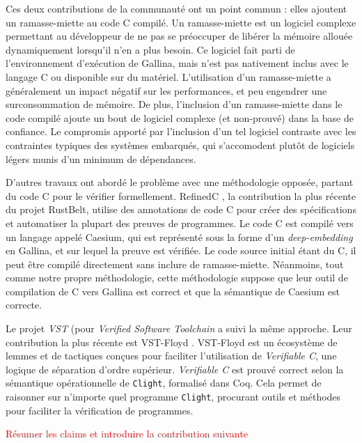 Ces deux contributions de la communauté ont un point commun : elles ajoutent un ramasse-miette au code C compilé. Un ramasse-miette est un logiciel complexe permettant au développeur de ne pas se préoccuper de libérer la mémoire allouée dynamiquement lorsqu'il n'en a plus besoin. Ce logiciel fait parti de l'environnement d'exécution de Gallina, mais n'est pas nativement inclus avec le langage C ou disponible sur du matériel. L'utilisation d'un ramasse-miette a généralement un impact négatif sur les performances, et peu engendrer une surconsommation de mémoire. De plus, l'inclusion d'un ramasse-miette dans le code compilé ajoute un bout de logiciel complexe (et non-prouvé) dans la base de confiance. Le compromis apporté par l'inclusion d'un tel logiciel contraste avec les contraintes typiques des systèmes embarqués, qui s'accomodent plutôt de logiciels légers munis d'un minimum de dépendances.

D'autres travaux ont abordé le problème avec une méthodologie opposée, partant du code C pour le vérifier formellement. RefinedC \cite{refinedC}, la contribution la plus récente du projet RustBelt, utilise des annotations de code C pour créer des spécifications et automatiser la plupart des preuves de programmes. Le code C est compilé vers un langage appelé Caesium, qui est représenté sous la forme d'un \emph{deep-embedding} en Gallina, et sur lequel la preuve est vérifiée.
Le code source initial étant du C, il peut être compilé directement sans inclure de ramasse-miette. Néanmoins, tout comme notre propre méthodologie, cette méthodologie suppose que leur outil de compilation de C vers Gallina est correct et que la sémantique de Caesium est correcte.

Le projet \emph{VST} (pour \emph{Verified Software Toolchain} a suivi la même approche. Leur contribution la plus récente est VST-Floyd \cite{cao2018vst}. VST-Floyd est un écosystème de lemmes et de tactiques conçues pour faciliter l'utilisation de \emph{Verifiable C}, une logique de séparation d'ordre supérieur. \emph{Verifiable C} est prouvé correct selon la sémantique opérationnelle de \texttt{Clight}, formalisé dans Coq. Cela permet de raisonner sur n'importe quel programme \texttt{Clight}, procurant outils et méthodes pour faciliter la vérification de programmes.

		\textcolor{red}{Résumer les claims et introduire la contribution suivante}
